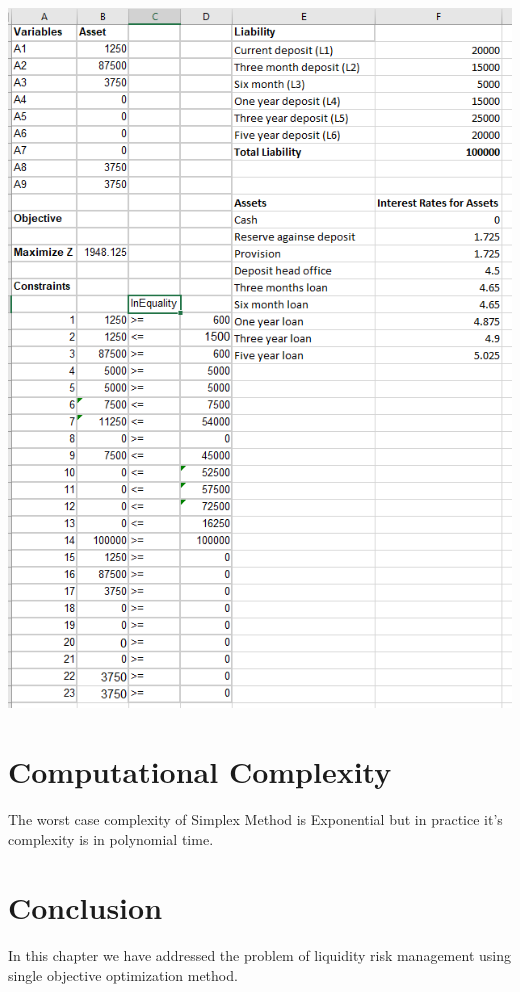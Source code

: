 				\begin{center}
				\includegraphics[width=\linewidth]{figures/LPP-Solution.jpg}	
				\label{fig: LPP Problem Solution in Excel}
				\end{center}
\section{Computational Complexity}
The worst case complexity of Simplex Method is Exponential but in practice it's complexity is in polynomial time.
\section{Conclusion }
In this chapter we have addressed the problem of liquidity risk management using single objective optimization method.








